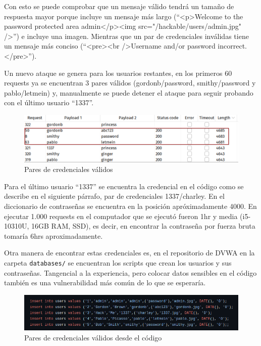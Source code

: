 \documentclass[letter,12pt]{article}
\newcommand{\code}[1]{\colorbox{lightgray!80}{\lstinline[breaklines=true]|#1|}}
\begin{document}
Con esto se puede comprobar que un mensaje válido tendrá un tamaño de respuesta
mayor porque incluye un mensaje más largo (``\textless p\textgreater Welcome to the password
protected area admin\textless /p\textgreater\textless img src="/hackable/users/admin.jpg" /\textgreater'') e incluye una
imagen. Mientras que un par de credenciales inválidas tiene un mensaje más
conciso (``\textless pre\textgreater \textless br /\textgreater Username and/or password incorrect.\textless /pre\textgreater'').

Un nuevo ataque se genera para los usuarios restantes, en los primeros 60
requests ya se encuentran 3 pares válidos (gordonb/password, smithy/password y
pablo/letmein) y, manualmente se puede detener el ataque para seguir probando
con el último usuario ``1337''.

\begin{figure}[H]
  \centering
  \includegraphics[width=16cm]{images/11-passwords-edited.png}
  \caption{Pares de credenciales válidos}
\end{figure}

Para el último usuario ``1337'' se encuentra la credencial en el código como se
describe en el siguiente párrafo, par de credenciales 1337/charley. En el
diccionario de contraseñas se encuentra en la posición apróximadamente 4000. En
ejecutar 1.000 requests en el computador que se ejecutó fueron 1hr y media
(i5-10310U, 16GB RAM, SSD), es decir, en encontrar la contraseña por fuerza
bruta tomaría 6hrs aproximadamente.

Otra manera de encontrar estas credenciales es, en el repositorio de DVWA en la
carpeta \code{databases/} se encuentran los scripts que crean los usuarios y sus
contraseñas. Tangencial a la experiencia, pero colocar datos sensibles en el
código también es una vulnerabilidad más común de lo que se esperaría.

\begin{figure}[H]
  \centering
  \includegraphics[width=16cm]{images/14-passwords.png}
  \caption{Pares de credenciales válidos desde el código}
\end{figure}
\end{document}
